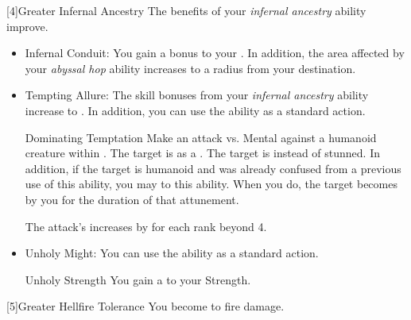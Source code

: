             [4]{Greater Infernal Ancestry} The benefits of your \textit{infernal ancestry} ability improve.
            \begin{itemize}
                \item Infernal Conduit: You gain a  bonus to your .
                    In addition, the area affected by your \textit{abyssal hop} ability increases to a \smallarea radius from your destination.
                \item Tempting Allure: The skill bonuses from your \textit{infernal ancestry} ability increase to .
                    In addition, you can use the  ability as a standard action.
                    \begin{magicalactiveability}{Dominating Temptation}{}
                        \rankline
                        \noindent
                        Make an attack vs. Mental against a humanoid creature within \shortrange.%
                        \vspace{0.25em}
                        \hit The target is \stunned as a .
                        \crit The target is \confused instead of stunned.
                        In addition, if the target is humanoid and was already confused from a previous use of this ability, you may  to this ability.
                        When you do, the target becomes \dominated by you for the duration of that attunement.

                        \rankline
                        \noindent The attack's  increases by  for each rank beyond 4.
                        \vspace{0.1em}
                    \end{magicalactiveability}
                \item Unholy Might: You can use the  ability as a standard action.
                    \begin{magicalattuneability}{Unholy Strength}{}
                        \rankline
                        You gain a   to your Strength.
                    \end{magicalattuneability}
            \end{itemize}

            [5]{Greater Hellfire Tolerance} You become  to fire damage.

